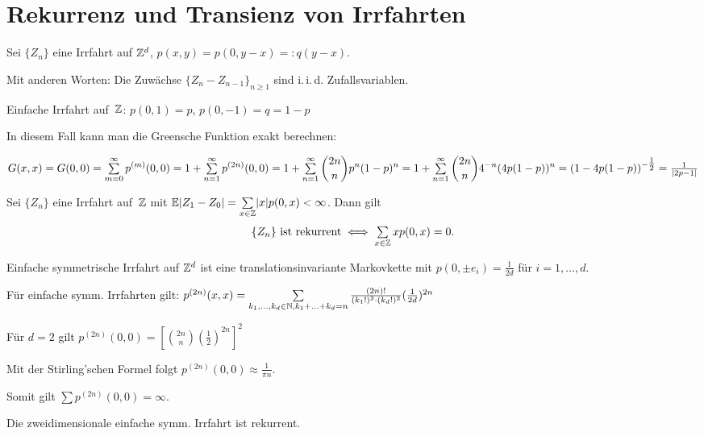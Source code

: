 \documentclass{cheat-sheet}
\newcommand{\E}{\mathbb{E}} %
\newcommand{\iid}{i.\,i.\,d.} %
\begin{document}
\section{Rekurrenz und Transienz von Irrfahrten}

Sei $\{ Z_n \}$ eine Irrfahrt auf $\mathbb{Z}^d$, \dh{} $p(x, y) = p(0, y - x) =: q(y - x)$.

Mit anderen Worten: Die Zuwächse $\{ Z_n - Z_{n-1} \}_{n \geq 1}$ sind \iid{} Zufallsvariablen.

\begin{bsp}
  Einfache Irrfahrt auf~$\mathbb{Z}$:
  $p(0, 1) = p$, $p(0, -1) = q = 1 - p$
\end{bsp}


In diesem Fall kann man die Greensche Funktion exakt berechnen:

\begin{align*}
  G(x, x) = G(0,0) = \sum_{m=0}^\infty p^{(m)}(0, 0) = 1 + \sum_{n=1}^\infty p^{(2n)}(0, 0) = 1 + \sum_{n=1}^\infty \binom{2n}{n} p^n (1-p)^n
  = 1 + \sum_{n=1}^\infty \binom{2n}{n} 4^{-n} (4 p (1-p))^n = (1 - 4 p (1-p))^{-\tfrac{1}{2}} = \tfrac{1}{\abs{2p - 1}}
\end{align*}

\begin{satz}
  Sei $\{ Z_n \}$ eine Irrfahrt auf~$\mathbb{Z}$ mit $\E \abs{Z_1 - Z_0} = \sum_{x \in \Z} \abs{x} p(0, x) < \infty$.
  Dann gilt
  \[
    \{ Z_n \} \text{ ist rekurrent} \iff \sum_{x \in \Z} x p(0, x) = 0.
  \]
\end{satz}

\begin{defn}
  Einfache symmetrische Irrfahrt auf $\mathbb{Z}^d$ ist eine translationsinvariante Markovkette mit $p(0, \pm e_i) = \tfrac{1}{2 d}$ für $i = 1, \ldots, d$.
\end{defn}

Für einfache symm. Irrfahrten gilt:
$p^{(2n)}(x, x) = \sum_{k_1, \ldots, k_d \in \N, k_1 + \ldots + k_d = n} \tfrac{(2n)!}{(k_1!)^2 \cdot (k_d!)^2} (\tfrac{1}{2d})^{2n}$

Für $d = 2$ gilt $p^{(2n)}(0, 0) = [\binom{2n}{n} (\tfrac{1}{2})^{2n}]^2$

Mit der Stirling'schen Formel folgt $p^{(2n)}(0, 0) \approx \tfrac{1}{\pi n}$.

Somit gilt $\sum p^{(2n)}(0,0) = \infty$.

\begin{fazit}
  Die zweidimensionale einfache symm. Irrfahrt ist rekurrent.
\end{fazit}
\end{document}
